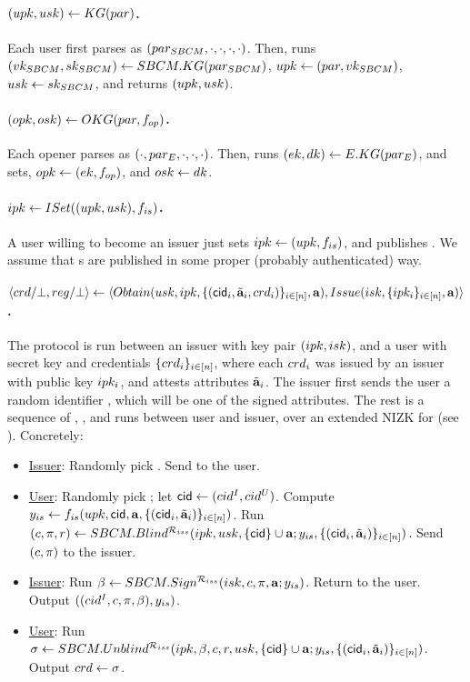 \paragraph{$(upk,usk) \gets KG(par)$.} %
Each user first parses \parm as $(par_{SBCM},\cdot,\cdot,\cdot,\cdot)$.
Then, runs $(vk_{SBCM},sk_{SBCM}) \gets SBCM.KG(par_{SBCM})$, $upk \gets (par,
vk_{SBCM})$, $usk \gets sk_{SBCM}$, and returns $(upk,usk)$.

\paragraph{$(opk,osk) \gets OKG(par,f_{op})$.} %
Each opener parses \parm as $(\cdot,par_{E},\cdot,\cdot,\cdot)$.
Then, runs $(ek,dk) \gets E.KG(par_{E})$, and sets, $opk \gets (ek,
f_{op})$, and $osk \gets dk$.

\paragraph{$ipk \gets ISet((upk,usk),f_{is})$.} %
A user willing to become an issuer just sets $ipk \gets (upk,f_{is})$, and
publishes \ipk. We assume that {\ipk}s are published in some proper (probably
authenticated) way.

\paragraph{$\langle crd/\bot,reg/\bot \rangle \gets
  \langle Obtain(usk,ipk,\lbrace (\mathsf{cid}_i,\tilde{\mathbf{a}}_i,crd_i) \rbrace_{i\in[n]},
  \mathbf{a}),Issue(isk,\lbrace ipk_i \rbrace_{i\in[n]},\mathbf{a})\rangle$.} %
The protocol is run between an issuer with key pair $(ipk,isk)$, and a user
with secret key \usk and credentials $\lbrace crd_i \rbrace_{i\in[n]}$, where
each $crd_i$ was issued by an issuer with public key $ipk_i$, and
attests attributes $\tilde{\mathbf{a}}_i$. The issuer first sends the user a random
identifier \cidi, which will be one of the signed attributes. The rest
is a sequence of \SBCMBlind, \SBCMSign, and \SBCMUnblind runs
between user and issuer, over an extended NIZK for \RelIss (see
). Concretely:

\begin{itemize}  
\item \underline{Issuer}: Randomly pick \cidi. Send \cidi to the user.
\item \underline{User}: Randomly pick \cidu; let $\mathsf{cid} \gets (cid^I,cid^U)$.
  Compute $y_{is} \gets f_{is}(upk,\mathsf{cid},\mathbf{a},\lbrace (\mathsf{cid}_i,\tilde{\mathbf{a}}_i)
  \rbrace_{i\in[n]})$. Run $(c,\pi,r) \gets SBCM.Blind^{\mathcal{R}_{iss}}(ipk,usk,
  \lbrace \mathsf{cid} \rbrace \cup \mathbf{a}; y_{is}, \lbrace (\mathsf{cid}_i,\tilde{\mathbf{a}}_i)
  \rbrace_{i\in[n]})$. Send $(c,\pi)$ to the issuer.
\item \underline{Issuer}: Run $\beta \gets SBCM.Sign^{\mathcal{R}_{iss}}(isk,c,
  \pi,\mathbf{a};y_{is})$. Return \bsig to the user. Output $((cid^I,c,\pi,
  \beta),y_{is})$. 
\item \underline{User}: Run $\sigma \gets SBCM.Unblind^{\mathcal{R}_{iss}}(ipk,
  \beta,c,r,usk,\lbrace \mathsf{cid} \rbrace \cup \mathbf{a}; y_{is}, \lbrace
  (\mathsf{cid}_i,\tilde{\mathbf{a}}_i)\rbrace_{i\in[n]})$. Output $crd \gets \sigma$.
\end{itemize}

